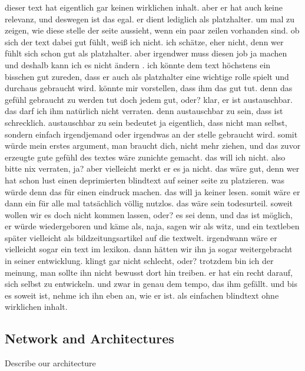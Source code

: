 \documentclass[conference]{IEEEtran}
\begin{document}
dieser text hat eigentlich gar keinen wirklichen inhalt. aber er hat auch keine relevanz, und deswegen ist das egal. er dient lediglich als platzhalter. um mal zu zeigen, wie diese stelle der seite aussieht, wenn ein paar zeilen vorhanden sind. ob sich der text dabei gut fühlt, weiß ich nicht. ich schätze, eher nicht, denn wer fühlt sich schon gut als platzhalter. aber irgendwer muss diesen job ja machen und deshalb kann ich es nicht ändern . ich könnte dem text höchstens ein bisschen gut zureden, dass er auch als platzhalter eine wichtige rolle spielt und durchaus gebraucht wird. könnte mir vorstellen, dass ihm das gut tut. denn das gefühl gebraucht zu werden tut doch jedem gut, oder? klar, er ist austauschbar. das darf ich ihm natürlich nicht verraten. denn austauschbar zu sein, dass ist schrecklich. austauschbar zu sein bedeutet ja eigentlich, dass nicht man selbst, sondern einfach irgendjemand oder irgendwas an der stelle gebraucht wird. somit würde mein erstes argument, man braucht dich, nicht mehr ziehen, und das zuvor erzeugte gute gefühl des textes wäre zunichte gemacht. das will ich nicht. also bitte nix verraten, ja? aber vielleicht merkt er es ja nicht. das wäre gut, denn wer hat schon lust einen deprimierten blindtext auf seiner seite zu platzieren. was würde denn das für einen eindruck machen. das will ja keiner lesen. somit wäre er dann ein für alle mal tatsächlich völlig nutzlos. das wäre sein todesurteil. soweit wollen wir es doch nicht kommen lassen, oder? es sei denn, und das ist möglich, er würde wiedergeboren und käme als, naja, sagen wir als witz, und ein textleben später vielleicht als bildzeitungsartikel auf die textwelt. irgendwann wäre er vielleicht sogar ein text im lexikon. dann hätten wir ihn ja sogar weitergebracht in seiner entwicklung. klingt gar nicht schlecht, oder? trotzdem bin ich der meinung, man sollte ihn nicht bewusst dort hin treiben. er hat ein recht darauf, sich selbst zu entwickeln. und zwar in genau dem tempo, das ihm gefällt. und bis es soweit ist, nehme ich ihn eben an, wie er ist. als einfachen blindtext ohne wirklichen inhalt.

\subsection{Network and Architectures}\label{AA}
Describe our architecture
\end{document}
